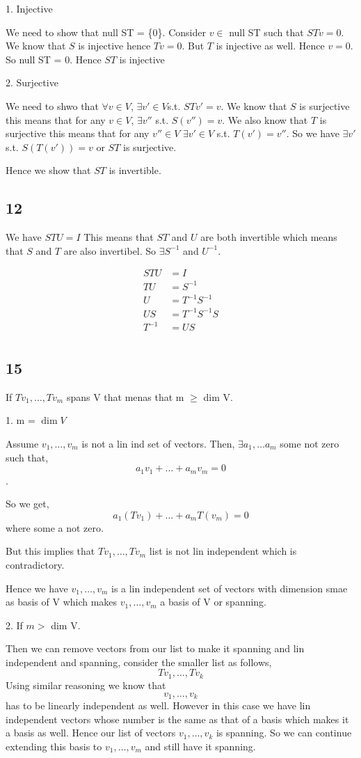 \documentclass[a4paper]{report}
\begin{document}
1. Injective

\quad We need to show that null ST = \{0\}. Consider $v \in $ null ST  such that $STv = 0$. We know that $S$ is injective hence $Tv = 0$. But  $T$ is injective as well. Hence $v = 0$. So null ST = 0. Hence $ST$ is injective

2. Surjective

\quad We need to shwo that $\forall v\in V$, $\exists v' \in V$s.t. $STv' = v$. We know that $S$ is surjective this means that for any $v \in V$, $\exists v'' $ s.t. $S(v'') = v$. We also know that $T$ is surjective this means that for any  $v'' \in V$ $\exists v' \in V$ s.t. $T(v') = v''$. So we have  $\exists v'$ s.t. $S(T(v')) = v$ or  $ST$ is surjective. 

Hence we show that $ST$ is invertible.


\subsection*{12}
We have $STU = I$ This means that $ST$ and  $U$ are both invertible which means that $S$ and $T$ are also invertibel. So $\exists S^{-1}$ and $U^{-1}$.

\begin{align*}
    STU &= I\\
    TU &= S^{-1}\\
    U &= T^{-1}S^{-1}\\
    US &= T^{-1}S^{-1}S\\
    T^{-1} &= US\\
\end{align*}

\subsection*{15}
If $Tv_1,\dots,Tv_m$ spans V that menas that m $\ge$ dim V.

1. m = $\dim V$

Assume $v_1,\dots,v_m$ is not a lin ind set of vectors. Then, $\exists a_1,\dots a_m$ some not zero such that, 
$$ a_1v_1 + \dots + a_mv_m = 0 $$ .

So we get, 
$$ a_1(Tv_1) + \dots + a_mT(v_m) = 0 $$ where some a not zero.

But this implies that $Tv_1,\dots,Tv_m$ list is not lin independent which is contradictory.

Hence we have $v_1,\dots,v_m$ is a lin independent set of vectors with dimension smae as basis of V which makes $v_1,\dots,v_m$ a basis of V or spanning.



2. If $m > $ dim V.

Then we can remove vectors from our list to make it spanning and lin independent and spanning, consider the smaller list as follows, 
$$ Tv_1,\dots,Tv_k $$ 
Using similar reasoning we know that  
$$ v_1,\dots,v_k $$  has to be linearly independent as well. However in this case we have lin independent vectors whose number is the same as that of a basis which makes it a basis as well. Hence our list of vectors $v_1,\dots,v_k$ is spanning. So we can continue extending this basis to $v_1,\dots,v_m$ and still have it spanning.
\end{document}

